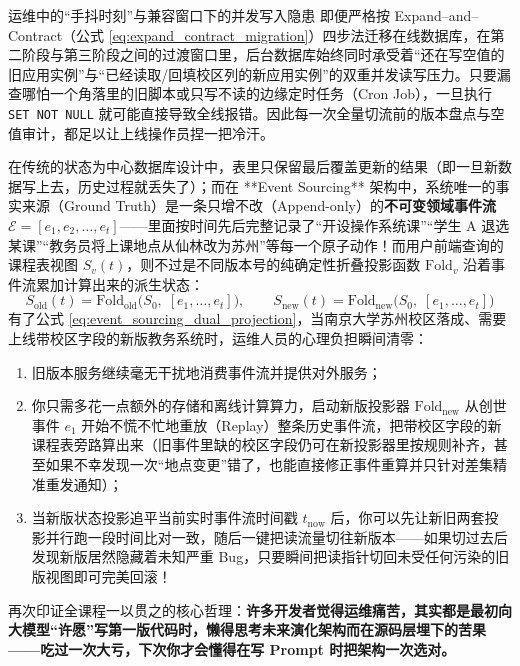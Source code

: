 \documentclass[a4paper]{article}
\begin{document}
\begin{warningbox}{运维中的“手抖时刻”与兼容窗口下的并发写入隐患}
即便严格按 Expand--and--Contract（公式 \eqref{eq:expand_contract_migration}）四步法迁移在线数据库，在第二阶段与第三阶段之间的过渡窗口里，后台数据库始终同时承受着“还在写空值的旧应用实例”与“已经读取/回填校区列的新应用实例”的双重并发读写压力。只要漏查哪怕一个角落里的旧脚本或只写不读的边缘定时任务（Cron Job），一旦执行 \texttt{SET NOT NULL} 就可能直接导致全线报错。因此每一次全量切流前的版本盘点与空值审计，都足以让上线操作员捏一把冷汗。
\end{warningbox}

在传统的状态为中心数据库设计中，表里只保留最后覆盖更新的结果（即一旦新数据写上去，历史过程就丢失了）；而在 **Event Sourcing** 架构中，系统唯一的事实来源（Ground Truth）是一条只增不改（Append-only）的\textbf{不可变领域事件流 $\mathcal{E} = [e_1, e_2, \dots, e_t]$}——里面按时间先后完整记录了“开设操作系统课”“学生 A 退选某课”“教务员将上课地点从仙林改为苏州”等每一个原子动作！而用户前端查询的课程表视图 $S_v(t)$，则不过是不同版本号的纯确定性折叠投影函数 $\mathrm{Fold}_v$ 沿着事件流累加计算出来的派生状态：
\begin{equation}
S_{\text{old}}(t) = \mathrm{Fold}_{\text{old}}\big(S_0,\; [e_1, \dots, e_t]\big), \qquad
S_{\text{new}}(t) = \mathrm{Fold}_{\text{new}}\big(S_0,\; [e_1, \dots, e_t]\big)
\label{eq:event_sourcing_dual_projection}
\end{equation}
有了公式 \eqref{eq:event_sourcing_dual_projection}，当南京大学苏州校区落成、需要上线带校区字段的新版教务系统时，运维人员的心理负担瞬间清零：
\begin{enumerate}
    \item 旧版本服务继续毫无干扰地消费事件流并提供对外服务；
    \item 你只需多花一点额外的存储和离线计算算力，启动新版投影器 $\mathrm{Fold}_{\text{new}}$ 从创世事件 $e_1$ 开始不慌不忙地重放（Replay）整条历史事件流，把带校区字段的新课程表旁路算出来（旧事件里缺的校区字段仍可在新投影器里按规则补齐，甚至如果不幸发现一次“地点变更”错了，也能直接修正事件重算并只针对差集精准重发通知）；
    \item 当新版状态投影追平当前实时事件流时间戳 $t_{\text{now}}$ 后，你可以先让新旧两套投影并行跑一段时间比对一致，随后一键把读流量切往新版本——如果切过去后发现新版居然隐藏着未知严重 Bug，只要瞬间把读指针切回未受任何污染的旧版视图即可完美回滚！
\end{enumerate}

再次印证全课程一以贯之的核心哲理：\textbf{许多开发者觉得运维痛苦，其实都是最初向大模型“许愿”写第一版代码时，懒得思考未来演化架构而在源码层埋下的苦果——吃过一次大亏，下次你才会懂得在写 Prompt 时把架构一次选对。}
\end{document}
